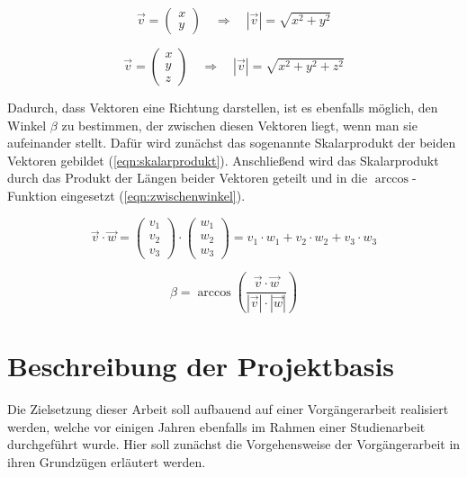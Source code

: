 \begin{equation}
    \label{eqn:laenge2d}
    \overrightarrow{v} = \begin{pmatrix}x \\ y\end{pmatrix}
    \quad \Rightarrow \quad
    |\overrightarrow{v}| = \sqrt{x^2 + y^2}
\end{equation}

\begin{equation}
    \label{eqn:laenge3d}
    \overrightarrow{v} = \begin{pmatrix}x \\ y \\ z\end{pmatrix}
    \quad \Rightarrow \quad
    |\overrightarrow{v}| = \sqrt{x^2 + y^2 + z^2}
\end{equation}

Dadurch, dass Vektoren eine Richtung darstellen, ist es ebenfalls möglich, den Winkel $\beta$ zu bestimmen, der zwischen diesen Vektoren liegt, wenn man sie aufeinander stellt.
Dafür wird zunächst das sogenannte Skalarprodukt der beiden Vektoren gebildet \cite[45]{kohn2012} (\autoref{eqn:skalarprodukt}).
Anschließend wird das Skalarprodukt durch das Produkt der Längen beider Vektoren geteilt und in die $\arccos$-Funktion eingesetzt \cite[60]{kohn2012} (\autoref{eqn:zwischenwinkel}).

\begin{equation}
    \label{eqn:skalarprodukt}
    \overrightarrow{v} \cdot \overrightarrow{w} =
    \begin{pmatrix}v_1 \\ v_2 \\ v_3\end{pmatrix} \cdot \begin{pmatrix}w_1 \\ w_2 \\ w_3\end{pmatrix} =
    v_1 \cdot w_1 + v_2 \cdot w_2 + v_3 \cdot w_3
\end{equation}

\begin{equation}
    \label{eqn:zwischenwinkel}
    \beta = \arccos(\frac{\overrightarrow{v} \cdot \overrightarrow{w}}{|\overrightarrow{v}| \cdot |\overrightarrow{w}|})
\end{equation}


\section{Beschreibung der Projektbasis}
Die Zielsetzung dieser Arbeit soll aufbauend auf einer Vorgängerarbeit \cite{waidner.2020} realisiert werden, welche vor einigen Jahren ebenfalls im Rahmen einer Studienarbeit durchgeführt wurde.
Hier soll zunächst die Vorgehensweise der Vorgängerarbeit in ihren Grundzügen erläutert werden.

